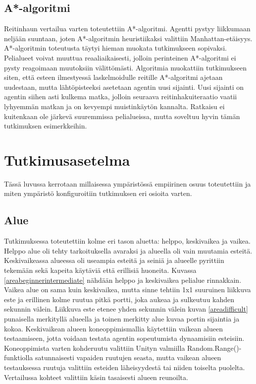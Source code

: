 \documentclass[utf8]{gradu3}
\begin{document}
\subsection{A*-algoritmi}

Reitinhaun vertailua varten toteutettiin A*-algoritmi. Agentti pystyy liikkumaan neljään suuntaan, joten A*-algoritmin heuristiikaksi valittiin Manhattan-etäisyys. A*-algoritmin toteutusta täytyi hieman muokata tutkimukseen sopivaksi. Pelialueet voivat muuttua reaaliaikaisesti, jolloin perinteinen A*-algoritmi ei pysty reagoimaan muutoksiin välittömästi. Algoritmia muokattiin tutkimukseen siten, että esteen ilmestyessä laskelmoidulle reitille A*-algoritmi ajetaan uudestaan, mutta lähtöpisteeksi asetetaan agentin uusi sijainti. Uusi sijainti on agentin siihen asti kulkema matka, jolloin seuraava reitinhakuiteraatio vaatii lyhyemmän matkan ja on kevyempi muistinkäytön kannalta. Ratkaisu ei kuitenkaan ole järkevä suuremmissa pelialueissa, mutta soveltuu hyvin tämän tutkimuksen esimerkkeihin.

\section{Tutkimusasetelma}
\label{sec:tutkimusasetelma}

Tässä luvussa kerrotaan millaisessa ympäristössä empiirinen osuus toteutettiin ja miten ympäristö konfiguroitiin tutkimuksen eri osioita varten.

\subsection{Alue}
\label{alue}

Tutkimuksessa toteutettiin kolme eri tason aluetta: helppo, keskivaikea ja vaikea. Helppo alue oli tehty tarkoituksella avaraksi ja alueella oli vain muutamia esteitä. Keskivaikeassa alueessa oli useampia esteitä ja seiniä ja alueelle pyrittiin tekemään sekä kapeita käytäviä että erillisiä huoneita. Kuvassa \ref{areabeginnerintermediate} nähdään helppo ja keskivaikea pelialue rinnakkain. Vaikea alue on sama kuin keskivaikea, mutta sinne tehtiin 1x1 suuruinen liikkuva este ja erillinen kolme ruutua pitkä portti, joka aukeaa ja sulkeutuu kahden sekunnin välein. Liikkuva este etenee yhden sekunnin välein kuvan \ref{areadifficult} punaisella merkityllä alueella ja toinen merkitty alue kuvaa portin sijaintia ja kokoa. Keskivaikean alueen koneoppimismallia käytettiin vaikean alueen testaamiseen, jotta voidaan testata agentin sopeutumista dynaamisiin esteisiin. Koneoppimista varten kohderuutu valittiin Unityn valmiilla Random.Range()-funktiolla satunnaisesti vapaiden ruutujen seasta, mutta vaikean alueen testauksessa ruutuja valittiin esteiden läheisyydestä tai niiden toiselta puolelta. Vertailussa kohteet valittiin käsin tasaisesti alueen reunoilta.
\end{document}
